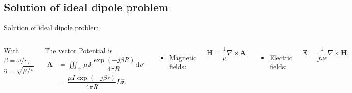 \subsection{Solution of ideal dipole problem}

\begin{frame}{Solution of ideal dipole problem}
    \begin{columns}
        \vspace{-4mm}
        
        With \( \beta = \omega/c \), \( \eta = \sqrt{\mu/\varepsilon}\) \\
        
        \vspace{2mm}
        
        The vector Potential is
        \begin{align*}
            \mathbf{A} & = \iiint_{v'} \mu \mathbf{J} \dfrac{ \exp( - j \beta R ) }{ 4 \pi R } \mathrm{d} v' \\
            & = \dfrac{ \mu I \exp( - j \beta r ) }{ 4 \pi R} L \mathbf{\hat{z}}.
        \end{align*}

        \begin{itemize}
            \item Magnetic fields:
        \end{itemize}
        \begin{equation*}
            \mathbf{H} = \dfrac{1}{\mu} \nabla \times \mathbf{A}.
        \end{equation*}

        \begin{itemize}
            \item Electric fields:
        \end{itemize}
        \begin{equation*}
            \mathbf{E} = \dfrac{1}{j \omega \epsilon} \nabla \times \mathbf{H}.
        \end{equation*}
        
        \vspace{-4mm}
        \begin{equation*}
            I(z') = \left\{
            \begin{array}{ll}
                I_0 & x'=0, y'=0, \lvert z' \rvert \le L/2.  \\
                0 & \text{everywhere else}.
            \end{array}
            \right.
        \end{equation*}
        

\end{columns}
\end{frame}
